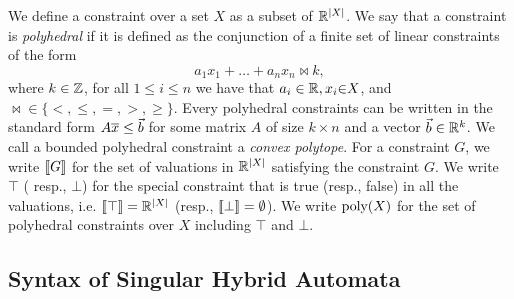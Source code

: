  We define a constraint over a set $X$ as a subset of $\mathbb R^{|X|}$.
 We say that a constraint is \emph{polyhedral} if it is defined as the conjunction
 of a finite set of linear constraints of the form 
 \[
 a_1 x_1 + \dots + a_n x_n \bowtie k,
 \]
 where $k \in \mathbb Z$, for all $1 \leq i \leq n$ we have that $a_i \in \mathbb R, x_i
 {\in} X$, and $\bowtie \in \{<,\leq, =, >, \geq\}$.   
 Every polyhedral constraints can be written in the standard form $A{\overline{x}} \leq
 \vec{b}$ for some matrix $A$ of size $k \times n$ and a vector $\vec{b} \in \mathbb R^k$.
 We call a bounded polyhedral constraint  a \emph{convex polytope}.
 For a constraint $G$, we write $[ \! [ {G} ] \! ]$ for the set of valuations in
 $\mathbb R^{|X|}$ satisfying the constraint $G$.  
 We write $\top$ ( resp., $\bot$) for the special constraint that is true
 (resp., false) in all the valuations, i.e. $[ \! [ {\top} ] \! ] = \mathbb R^{|X|}$ 
(resp., $[ \! [ {\bot} ] \! ] = \emptyset$). 
 We write $\textrm{poly}(X)$ for the set of polyhedral constraints over $X$ including
 $\top$ and $\bot$.  
 
\subsection{Syntax of Singular Hybrid Automata}

